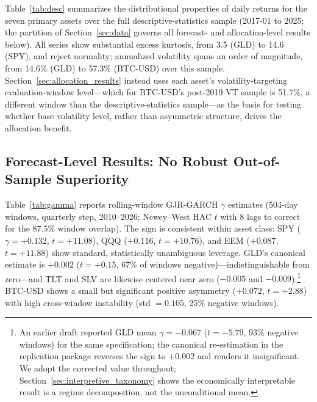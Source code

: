 Table~\ref{tab:desc} summarizes the distributional properties of daily returns for the seven primary assets over the full descriptive-statistics sample (2017-01 to 2025; the partition of Section~\ref{sec:data} governs all forecast- and allocation-level results below).%
All series show substantial excess kurtosis, from 3.5 (GLD) to 14.6 (SPY), and reject normality; annualized volatility spans an order of magnitude, from 14.6\% (GLD) to 57.3\% (BTC-USD) over this sample. Section~\ref{sec:allocation_results} instead uses each asset's volatility-targeting evaluation-window level---which for BTC-USD's post-2019 VT sample is 51.7\%, a different window than the descriptive-statistics sample---as the basis for testing whether base volatility level, rather than asymmetric structure, drives the allocation benefit.

\subsection{Forecast-Level Results: No Robust Out-of-Sample Superiority}
\label{sec:forecast_results}

Table~\ref{tab:gamma} reports rolling-window GJR-GARCH $\gamma$ estimates (504-day windows, quarterly step, 2010--2026; Newey--West HAC $t$ with 8 lags to correct for the 87.5\% window overlap).%
The sign is consistent within asset class: SPY ($\gamma=+0.132$, $t=+11.08$), QQQ ($+0.116$, $t=+10.76$), and EEM ($+0.087$, $t=+11.88$) show standard, statistically unambiguous leverage. GLD's canonical estimate is $+0.002$ ($t=+0.15$, 67\% of windows negative)---indistinguishable from zero---and TLT and SLV are likewise centered near zero ($-0.005$ and $-0.009$).\footnote{An earlier draft reported GLD mean $\gamma=-0.067$ ($t=-5.79$, 93\% negative windows) for the same specification; the canonical re-estimation in the replication package reverses the sign to $+0.002$ and renders it insignificant. We adopt the corrected value throughout; Section~\ref{sec:interpretive_taxonomy} shows the economically interpretable result is a regime decomposition, not the unconditional mean.} BTC-USD shows a small but significant positive asymmetry ($+0.072$, $t=+2.88$) with high cross-window instability (std $=0.105$, 25\% negative windows).

